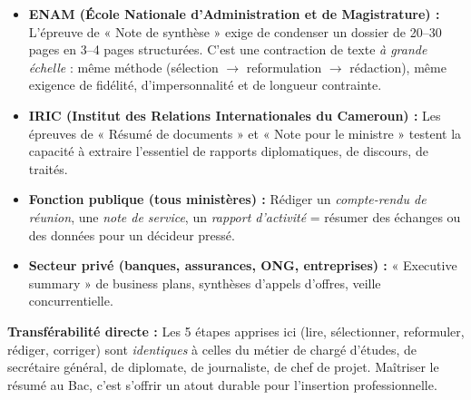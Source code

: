\documentclass[11pt]{article}
\begin{document}
\begin{savaistu}
\begin{itemize}
\item \textbf{ENAM (École Nationale d'Administration et de Magistrature) :} L'épreuve de « Note de synthèse » exige de condenser un dossier de 20--30 pages en 3--4 pages structurées. C'est une contraction de texte \emph{à grande échelle} : même méthode (sélection $\rightarrow$ reformulation $\rightarrow$ rédaction), même exigence de fidélité, d'impersonnalité et de longueur contrainte.
\item \textbf{IRIC (Institut des Relations Internationales du Cameroun) :} Les épreuves de « Résumé de documents » et « Note pour le ministre » testent la capacité à extraire l'essentiel de rapports diplomatiques, de discours, de traités.
\item \textbf{Fonction publique (tous ministères) :} Rédiger un \emph{compte-rendu de réunion}, une \emph{note de service}, un \emph{rapport d'activité} = résumer des échanges ou des données pour un décideur pressé.
\item \textbf{Secteur privé (banques, assurances, ONG, entreprises) :} « Executive summary » de business plans, synthèses d'appels d'offres, veille concurrentielle.
\end{itemize}
\textbf{Transférabilité directe :} Les 5 étapes apprises ici (lire, sélectionner, reformuler, rédiger, corriger) sont \emph{identiques} à celles du métier de chargé d'études, de secrétaire général, de diplomate, de journaliste, de chef de projet. Maîtriser le résumé au Bac, c'est s'offrir un atout durable pour l'insertion professionnelle.
\end{savaistu}
\end{document}
